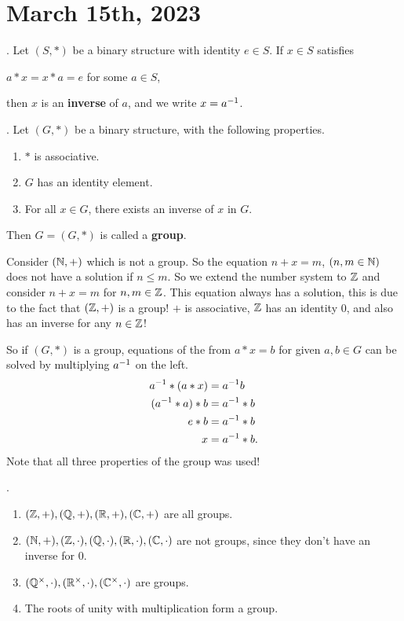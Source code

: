 \section*{March 15th, 2023}


.  Let \((S, *)\) be a binary structure with identity \(e \in S\). If \(x \in S\) satisfies
\begin{center}
    \(a * x = x * a = e\) for some \(a \in S\),
\end{center}
then \(x\) is an \textbf{inverse} of \(a\), and we write \(x = a^{-1}\).

.  Let \((G, *)\) be a binary structure, with the following properties.
\begin{enumerate}
    \item \(*\) is associative.
    \item \(G\) has an identity element.
    \item For all \(x \in G\), there exists an inverse of \(x\) in \(G\).
\end{enumerate}
Then \(G = (G, *)\) is called a \textbf{group}.

Consider \((\mathbb{N}, +)\) which is not a group. So the equation \(n + x = m\), \((n, m \in \mathbb{N})\) does not have a solution if \(n \leq m\). So we extend the number system to \(\mathbb{Z}\) and consider \(n + x = m\) for \(n, m \in \mathbb{Z}\). This equation always has a solution, this is due to the fact that \((\mathbb{Z}, +)\) is a group! \(+\) is associative, \(\mathbb{Z}\) has an identity \(0\), and also has an inverse for any \(n\in \mathbb{Z}\)!

So if \((G, *)\) is a group, equations of the from \(a * x = b\) for given \(a, b \in G\) can be solved by multiplying \(a^{-1}\) on the left.
\[
    \begin{aligned}
        a^{-1} * (a * x) & = a^{-1} b    \\
        (a^{-1} * a) * b & = a^{-1} * b  \\
        e * b           & = a^{-1} * b  \\
        x               & = a^{-1} * b.
    \end{aligned}
\]
Note that all three properties of the group was used!

\ex.
\begin{enumerate}
    \item \((\mathbb{Z}, +), (\mathbb{Q}, +), (\mathbb{R}, +), (\mathbb{C}, +)\) are all groups.
    \item \((\mathbb{N}, +), (\mathbb{Z}, \cdot), (\mathbb{Q}, \cdot), (\mathbb{R}, \cdot), (\mathbb{C}, \cdot)\) are not groups, since they don't have an inverse for \(0\).
    \item \((\mathbb{Q}^\times, \cdot), (\mathbb{R}^\times, \cdot), (\mathbb{C}^\times, \cdot)\) are groups.
    \item The roots of unity with multiplication form a group.
\end{enumerate}


